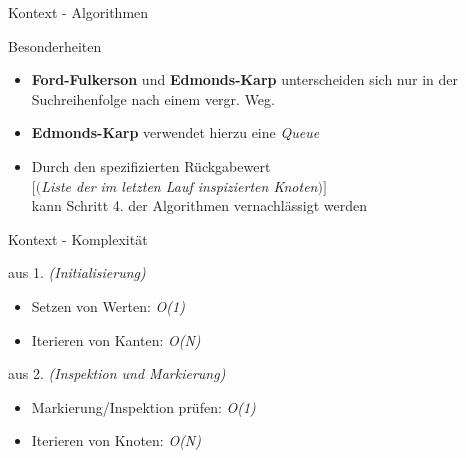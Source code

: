 \documentclass{beamer}
\begin{document}
    \begin{frame}{Kontext - Algorithmen}
        \begin{block}{Besonderheiten}
            \begin{itemize}
                \item \textbf{Ford-Fulkerson} und \textbf{Edmonds-Karp} unterscheiden sich nur in der Suchreihenfolge nach einem vergr. Weg.
                \item \textbf{Edmonds-Karp} verwendet hierzu eine \textit{Queue}
                \item Durch den spezifizierten R\"uckgabewert\\
                $[($\textit{Liste der im letzten Lauf inspizierten Knoten}$)]$\\
                kann Schritt 4. der Algorithmen vernachl\"assigt werden
            \end{itemize}
        \end{block}
    \end{frame}

    \begin{frame}{Kontext - Komplexit\"at}
        \begin{block}{aus 1. \textit{(Initialisierung)}}
            \begin{itemize}
                \item Setzen von Werten: \textit{O(1)}
                \item Iterieren von Kanten: \textit{O(N)}
            \end{itemize}
        \end{block}
        \begin{block}{aus 2. \textit{(Inspektion und Markierung)}}
            \begin{itemize}
                \item Markierung/Inspektion pr\"ufen: \textit{O(1)}
                \item Iterieren von Knoten: \textit{O(N)}
            \end{itemize}
        \end{block}
    \end{frame}
\end{document}
